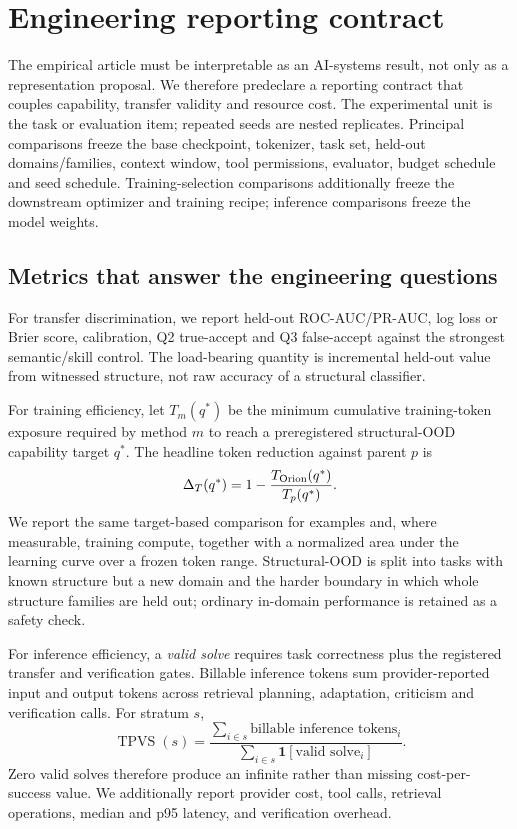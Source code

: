 \section{Engineering reporting contract}\label{sec:reporting}

The empirical article must be interpretable as an AI-systems result, not only as a representation proposal. We therefore predeclare a reporting contract that couples capability, transfer validity and resource cost. The experimental unit is the task or evaluation item; repeated seeds are nested replicates. Principal comparisons freeze the base checkpoint, tokenizer, task set, held-out domains/families, context window, tool permissions, evaluator, budget schedule and seed schedule. Training-selection comparisons additionally freeze the downstream optimizer and training recipe; inference comparisons freeze the model weights.

\subsection{Metrics that answer the engineering questions}

For transfer discrimination, we report held-out ROC-AUC/PR-AUC, log loss or Brier score, calibration, Q2 true-accept and Q3 false-accept against the strongest semantic/skill control. The load-bearing quantity is incremental held-out value from witnessed structure, not raw accuracy of a structural classifier.

For training efficiency, let $T_m(q^*)$ be the minimum cumulative training-token exposure required by method $m$ to reach a preregistered structural-OOD capability target $q^*$. The headline token reduction against parent $p$ is
\[
\Delta_T(q^*)=1-\frac{T_{\rm Orion}(q^*)}{T_p(q^*)}.
\]
We report the same target-based comparison for examples and, where measurable, training compute, together with a normalized area under the learning curve over a frozen token range. Structural-OOD is split into tasks with known structure but a new domain and the harder boundary in which whole structure families are held out; ordinary in-domain performance is retained as a safety check.

For inference efficiency, a \emph{valid solve} requires task correctness plus the registered transfer and verification gates. Billable inference tokens sum provider-reported input and output tokens across retrieval planning, adaptation, criticism and verification calls. For stratum $s$,
\[
\operatorname{TPVS}(s)=
\frac{\sum_{i\in s}\text{billable inference tokens}_i}
{\sum_{i\in s}\mathbf 1[\text{valid solve}_i]}.
\]
Zero valid solves therefore produce an infinite rather than missing cost-per-success value. We additionally report provider cost, tool calls, retrieval operations, median and p95 latency, and verification overhead.

